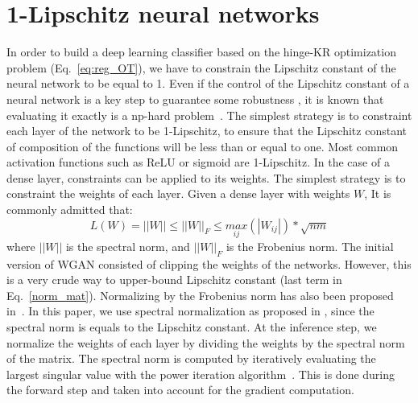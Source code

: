 \documentclass{article}
\begin{document}
\section{1-Lipschitz neural networks}
\label{sec:lip_const}
In order to build a deep learning classifier based on the hinge-KR optimization problem (Eq.~\eqref{eq:reg_OT}), we have to constrain the Lipschitz constant of the neural network to be equal to 1. Even if the control of the Lipschitz constant of a neural network is a key step to guarantee some robustness \cite{cisse_parseval_2017}, it is known that evaluating it exactly is a np-hard problem~\cite{NIPS2018_7640}. The simplest strategy is to constraint each layer of the network to be 1-Lipschitz, to ensure that the Lipschitz constant of composition of the functions will be less than or equal to one. Most common activation functions such as ReLU or sigmoid are 1-Lipschitz. In the case of a dense layer, constraints can be applied to its weights. 
The simplest strategy is to constraint the weights of each layer.  Given a dense layer with weights $W$, 
It is commonly admitted that:
\begin{equation}
\label{norm_mat}
    L(W)=||W|| \leq ||W ||_F \leq \underset{ij}{max}(|W_{ij}|)*\sqrt{nm}
\end{equation}
where $|| W||$ is the spectral norm, and  $|| W||_F$ is the Frobenius norm.
The initial version of WGAN \cite{Arjovsky2017} consisted of clipping the weights of the networks. However, this is a very crude way to upper-bound Lipschitz constant (last term in Eq.~\eqref{norm_mat}).
Normalizing by the Frobenius norm has also been proposed in~\cite{SalimansK16}. In this paper, we use spectral normalization as proposed in \cite{Miyato2018SpectralNF}, since the spectral norm is equals to the Lipschitz constant. At the inference step, we normalize the weights of each layer by dividing the weights by the spectral norm of the matrix. The spectral norm is computed by iteratively evaluating the largest singular value with the power iteration algorithm~\cite{GOLUB200035}. This is done during the forward step and taken into account for the gradient computation.\\
\end{document}
